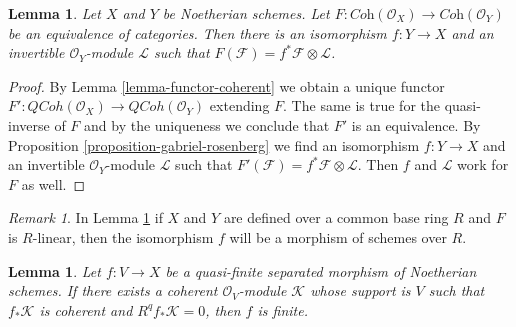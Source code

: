 \documentclass{stacks-project}
\theoremstyle{plain}
\newtheorem{lemma}[subsection]{Lemma}
\theoremstyle{definition}
\theoremstyle{remark}
\newtheorem{remark}[subsection]{Remark}
\numberwithin{equation}{subsection}
\def\QCoh{\mathit{QCoh}}
\begin{document}
\begin{lemma}
\label{lemma-equivalence-coherent}
Let $X$ and $Y$ be Noetherian schemes. Let
$F : \textit{Coh}(\mathcal{O}_X) \to \textit{Coh}(\mathcal{O}_Y)$
be an equivalence of categories. Then there is an isomorphism $f : Y \to X$
and an invertible $\mathcal{O}_Y$-module $\mathcal{L}$
such that $F(\mathcal{F}) = f^*\mathcal{F} \otimes \mathcal{L}$.
\end{lemma}

\begin{proof}
By Lemma \ref{lemma-functor-coherent} we obtain a unique functor
$F' : \QCoh(\mathcal{O}_X) \to \QCoh(\mathcal{O}_Y)$ extending $F$.
The same is true for the quasi-inverse of $F$ and by the uniqueness
we conclude that $F'$ is an equivalence. By
Proposition \ref{proposition-gabriel-rosenberg}
we find an isomorphism $f : Y \to X$
and an invertible $\mathcal{O}_Y$-module $\mathcal{L}$
such that $F'(\mathcal{F}) = f^*\mathcal{F} \otimes \mathcal{L}$.
Then $f$ and $\mathcal{L}$ work for $F$ as well.
\end{proof}

\begin{remark}
\label{remark-equivalence-coherent-linear}
In Lemma \ref{lemma-equivalence-coherent} if $X$ and $Y$ are defined
over a common base ring $R$ and $F$ is $R$-linear, then the isomorphism
$f$ will be a morphism of schemes over $R$.
\end{remark}

\begin{lemma}
\label{lemma-characterize-finite}
Let $f : V \to X$ be a quasi-finite separated morphism of Noetherian
schemes. If there exists a coherent $\mathcal{O}_V$-module $\mathcal{K}$
whose support is $V$ such that $f_*\mathcal{K}$ is coherent and
$R^qf_*\mathcal{K} = 0$, then $f$ is finite.
\end{lemma}
\end{document}
